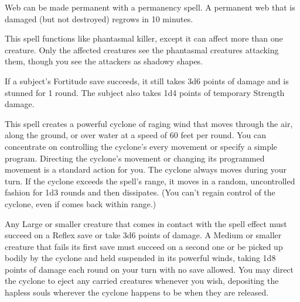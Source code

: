 \begin{multicols}{2}
\begin{small}
\smallskip\noindent Web can be made permanent with a permanency spell. A permanent web that is damaged (but not destroyed) regrows in 10 minutes.


\noindent This spell functions like phantasmal killer, except it can affect more than one creature. Only the affected creatures see the phantasmal creatures attacking them, though you see the attackers as shadowy shapes.

\smallskip\noindent If a subject's Fortitude save succeeds, it still takes 3d6 points of damage and is stunned for 1 round. The subject also takes 1d4 points of temporary Strength damage.

\noindent This spell creates a powerful cyclone of raging wind that moves through the air, along the ground, or over water at a speed of 60 feet per round. You can concentrate on controlling the cyclone's every movement or specify a simple program. Directing the cyclone's movement or changing its programmed movement is a standard action for you. The cyclone always moves during your turn. If the cyclone exceeds the spell's range, it moves in a random, uncontrolled fashion for 1d3 rounds and then dissipates. (You can't regain control of the cyclone, even if comes back within range.)

\smallskip\noindent Any Large or smaller creature that comes in contact with the spell effect must succeed on a Reflex save or take 3d6 points of damage. A Medium or smaller creature that fails its first save must succeed on a second one or be picked up bodily by the cyclone and held suspended in its powerful winds, taking 1d8 points of damage each round on your turn with no save allowed. You may direct the cyclone to eject any carried creatures whenever you wish, depositing the hapless souls wherever the cyclone happens to be when they are released.


\end{small}
\end{multicols}

